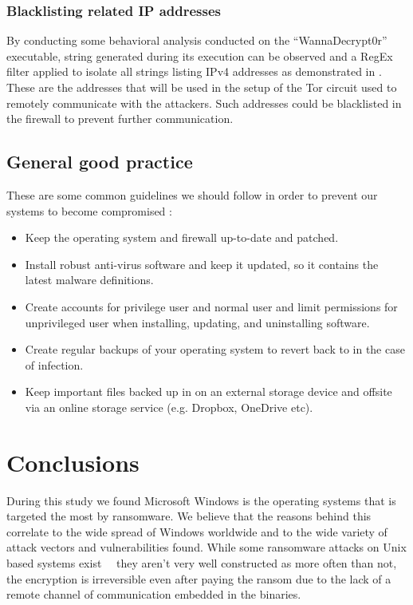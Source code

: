 \documentclass[10pt,a4paper]{article}
\begin{document}
\subsubsection{Blacklisting related IP addresses}
By conducting some behavioral analysis conducted on the ``WannaDecrypt0r'' executable, string generated during its execution can be observed and a RegEx filter applied to isolate all strings listing IPv4 addresses as demonstrated in \cite{wanacryFindIpAddr}. These are the addresses that will be used in the setup of the Tor circuit used to remotely communicate with the attackers. Such addresses could be blacklisted in the firewall to prevent further communication.

\subsection{General good practice}
These are some common guidelines we should follow in order to prevent our systems to become compromised \cite{genernalmitigation}: 
\begin{itemize}
\item Keep the operating system and firewall up-to-date and patched.
\item Install robust anti-virus software and keep it updated, so it contains the latest malware definitions.
\item Create accounts for privilege user and normal user and limit permissions for unprivileged user when installing, updating, and uninstalling software.
\item Create regular backups of your operating system to revert back to in the case of infection.
\item Keep important files backed up in on an external storage device and offsite via an online storage service (e.g. Dropbox, OneDrive etc).
\end{itemize}


\section{Conclusions}
During this study we found Microsoft Windows is the operating systems that is targeted the most by ransomware. We believe that the reasons behind this correlate to the wide spread of Windows worldwide and to the wide variety of attack vectors and vulnerabilities found. While some ransomware attacks on Unix based systems exist~\cite{linuxRansomware}~\cite{osxRansomware} they aren't very well constructed as more often than not, the encryption is irreversible even after paying the ransom due to the lack of a remote channel of communication embedded in the binaries.
\end{document}
